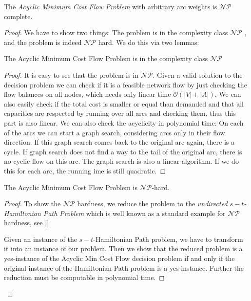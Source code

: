 \begin{theorem}
 The \textit{Acyclic Minimum Cost Flow Problem} with arbitrary arc weights is $\mathcal{NP}$ complete.
\end{theorem}
\begin{proof}
 We have to show two things: The problem is in the complexity class $\mathcal{NP}$ , and the problem is indeed 
$\mathcal{NP}$ hard. We do this via two lemmas:
\begin{lemma}
 The Acyclic Minimum Cost Flow Problem is in the complexity class $\mathcal{NP}$
\end{lemma}
\begin{proof}
It is easy to see that the problem is in $\mathcal{NP}$. Given a valid solution to the decision problem we can check if 
it is a feasible network flow by just checking the flow balances on all nodes, which needs only linear time 
$\mathcal{O}(|V|+|A|)$. We can also easily check if the total cost is smaller or equal than demanded and that all 
capacities are respected by running over all arcs and checking them, thus this part is also linear.
We can also check the acyclicity in polynomial time: On each of the arcs we can start a graph search, considering arcs 
only in their flow direction. If this graph search comes back to the original arc again, there is a cycle. %
If graph search does not find a way to the tail of the original arc, there is no cyclic flow on this arc. The graph 
search is also a linear algorithm. If we do this for each arc, the running ime is still quadratic.
\end{proof}

\begin{lemma}
 The Acyclic Minimum Cost Flow Problem is $\mathcal{NP}$-hard.
\end{lemma}
\begin{proof}

To show the $\mathcal{NP}$ hardness, we reduce the problem to the \textit{undirected $s-t$-Hamiltonian Path Problem} 
which is well known as a standard example for $\mathcal{NP}$ hardness, see \ref{} 

Given an instance of the $s-t$-Hamiltonian Path problem, we have to transform it into an instance of our problem. Then 
we show that the reduced problem is a yes-instance of the Acyclic Min Cost Flow decision problem if and only if the 
original instance of the Hamiltonian Path problem is a yes-instance. Further the reduction must be computable in 
polynomial time.


\end{proof}
\end{proof}
